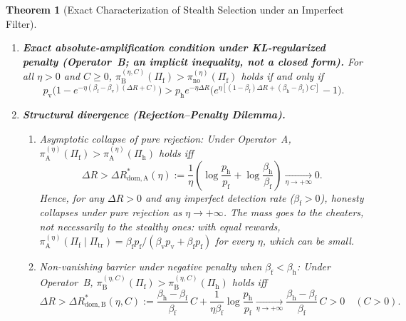 \documentclass[11pt,a4paper]{article}
\newtheorem{theorem}{Theorem}
\begin{document}
\begin{theorem}[Exact Characterization of Stealth Selection under an Imperfect Filter]
\begin{enumerate}
  \item \textbf{Exact absolute-amplification condition under KL-regularized penalty (Operator~B; an implicit inequality, not a closed form).} For all $\eta > 0$ and $C \ge 0$, $\pi_{\mathrm{B}}^{(\eta, C)}(\Pi_{\mathrm{f}}) > \pi_{\mathrm{no}}^{(\eta)}(\Pi_{\mathrm{f}})$ holds if and only if
  \begin{equation}\label{eq:ampB}
    p_{\mathrm{v}}\Big(1 - e^{-\eta(\beta_{\mathrm{f}} - \beta_{\mathrm{v}})(\Delta R + C)}\Big)
    > p_{\mathrm{h}} e^{-\eta \Delta R}\Big(e^{\eta[(1-\beta_{\mathrm{f}})\Delta R + (\beta_{\mathrm{h}} - \beta_{\mathrm{f}})C]} - 1\Big).
  \end{equation}

  \item \textbf{Structural divergence (Rejection--Penalty Dilemma).}
  \begin{enumerate}
    \item \emph{Asymptotic collapse of pure rejection:} Under Operator~A, $\pi_{\mathrm{A}}^{(\eta)}(\Pi_{\mathrm{f}}) > \pi_{\mathrm{A}}^{(\eta)}(\Pi_{\mathrm{h}})$ holds iff
    \begin{equation}\label{eq:domA}
      \Delta R > \Delta R_{\mathrm{dom, A}}^*(\eta)
      := \frac{1}{\eta}\left(\log\frac{p_{\mathrm{h}}}{p_{\mathrm{f}}} + \log\frac{\beta_{\mathrm{h}}}{\beta_{\mathrm{f}}}\right)
      \xrightarrow[\eta \to +\infty]{} 0.
    \end{equation}
    Hence, for any $\Delta R > 0$ and any imperfect detection rate ($\beta_{\mathrm{f}} > 0$), honesty collapses under pure rejection as $\eta \to +\infty$. The mass goes to the cheaters, not necessarily to the stealthy ones: with equal rewards, $\pi_{\mathrm{A}}^{(\eta)}(\Pi_{\mathrm{f}} \mid \Pi_{\mathrm{tr}}) = \beta_{\mathrm{f}}p_{\mathrm{f}}/(\beta_{\mathrm{v}}p_{\mathrm{v}} + \beta_{\mathrm{f}}p_{\mathrm{f}})$ for every $\eta$, which can be small.
    \item \emph{Non-vanishing barrier under negative penalty when $\beta_{\mathrm{f}} < \beta_{\mathrm{h}}$:} Under Operator~B, $\pi_{\mathrm{B}}^{(\eta, C)}(\Pi_{\mathrm{f}}) > \pi_{\mathrm{B}}^{(\eta, C)}(\Pi_{\mathrm{h}})$ holds iff
    \begin{equation}\label{eq:domB}
      \Delta R > \Delta R_{\mathrm{dom, B}}^*(\eta, C)
      := \frac{\beta_{\mathrm{h}} - \beta_{\mathrm{f}}}{\beta_{\mathrm{f}}}\,C + \frac{1}{\eta \beta_{\mathrm{f}}}\log\frac{p_{\mathrm{h}}}{p_{\mathrm{f}}}
      \xrightarrow[\eta \to +\infty]{} \frac{\beta_{\mathrm{h}} - \beta_{\mathrm{f}}}{\beta_{\mathrm{f}}}\,C > 0 \quad (C > 0).

\end{equation}
\end{enumerate}
\end{enumerate}
\end{theorem}
\end{document}
